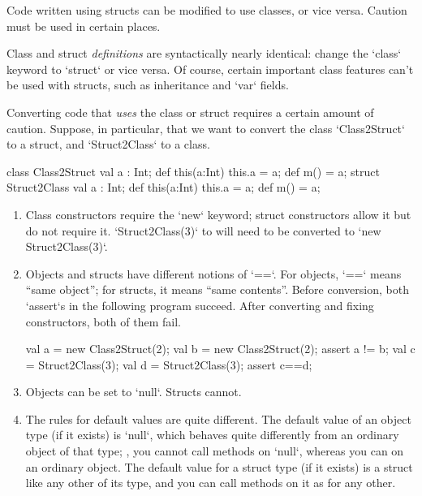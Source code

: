 Code written using structs can be modified to use classes, or vice versa.
Caution must be used in certain places. 

Class and struct {\em definitions} are syntactically nearly identical:
change the \xcd`class` keyword to \xcd`struct` or vice versa.  Of course,
certain important class features can't be used with structs, such as
inheritance and \xcd`var` fields. 

Converting code that {\em uses} the class or struct requires a certain amount
of caution.
Suppose, in particular, that we want to convert the class \xcd`Class2Struct`
to a struct, and \xcd`Struct2Class` to a class.
\begin{xten}
class Class2Struct {
  val a : Int;
  def this(a:Int) { this.a = a; }
  def m() = a;
}
struct Struct2Class { 
  val a : Int;
  def this(a:Int) { this.a = a; }
  def m() = a;
}
\end{xten}
%

\begin{enumerate}

\item Class constructors require the \xcd`new` keyword; struct constructors
      allow  it but do not require it.  
      \xcd`Struct2Class(3)` to will need to be converted to 
      \xcd`new Struct2Class(3)`.

\item Objects and structs have different notions of \xcd`==`.  
      For objects, \xcd`==` means ``same object''; for structs, it means
      ``same contents''. Before conversion, both \xcd`assert`s in the
      following program succeed.  After converting and fixing constructors,
      both of them fail.
\begin{xten}
val a = new Class2Struct(2);
val b = new Class2Struct(2);
assert a != b;
val c = Struct2Class(3);
val d = Struct2Class(3);
assert c==d;
\end{xten}

\item Objects can be set to \xcd`null`.  Structs cannot.  

\item The rules for default values are quite different.  
The default value of an object type (if it exists) is \xcd`null`, which behaves quite
differently from an ordinary object of that type; \eg, you cannot call methods
on \xcd`null`, whereas you can on an ordinary object. The default value for
a struct type (if it exists) is a struct like any other of its type, and you
can call methods on it as for any other.


\end{enumerate}
